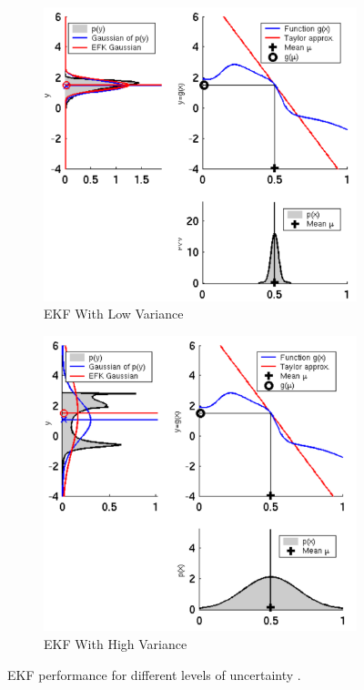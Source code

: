 \documentclass[twoside]{article}
\begin{document}
\begin{figure}[H]
\centering
\begin{subfigure}{.5\textwidth}
  \centering
  \includegraphics[width=.9\linewidth]{EKF_low_var.png}
  \caption{EKF With Low Variance}
  \label{fig:EKF_low_var}
\end{subfigure}%
\begin{subfigure}{.5\textwidth}
  \centering
  \includegraphics[width=.9\linewidth]{EKF_high_var.png}
  \caption{EKF With High Variance}
  \label{fig:EKF_high_var}
\end{subfigure}
\caption{EKF performance for different levels of uncertainty \cite{Xmisc}.}
\label{fig:EKF_variance}
\end{figure}
\end{document}

